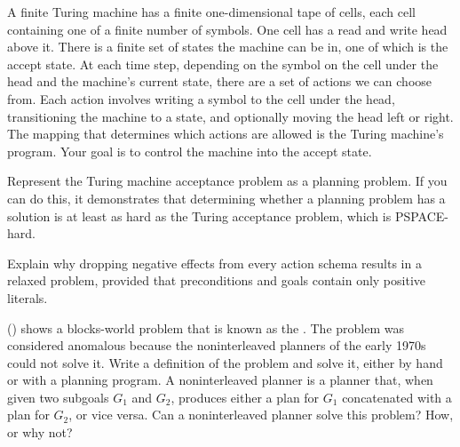 \begin{uexercise}
A finite Turing machine has a
finite one-dimensional tape of cells, each cell containing one of a
finite number of symbols.  One cell has a read and write head above
it. There is a finite set of states the machine can be in, one of
which is the accept state.  At each time step, depending on the symbol
on the cell under the head and the machine's current state, there are
a set of actions we can choose from. Each action involves writing a
symbol to the cell under the head, transitioning the machine to a
state, and optionally moving the head left or right. The mapping that
determines which actions are allowed is the Turing machine's program.
Your goal is to control the machine into the accept state.

Represent the Turing machine acceptance problem as a planning problem.
If you can do this, it demonstrates that determining whether a
planning problem has a solution is at least as hard as the Turing
acceptance problem, which is PSPACE-hard.
\end{uexercise} 



\begin{exercise}%
Explain why dropping negative effects from
every action schema results in a relaxed
problem, provided that preconditions and goals contain only positive literals.
\end{exercise} 

\begin{exercise}%
 () shows a blocks-world  problem
that is known as the . 
The problem was considered
anomalous because the noninterleaved planners
of the early 1970s could not solve it.  Write a definition of the
problem and solve it, either by hand or with a
planning program.  A noninterleaved planner is a planner that, when
given two subgoals \(G_{1}\) and \(G_{2}\), produces either a plan for \(G_{1}\) 
concatenated with a plan for \(G_{2}\), or vice versa.  Can a 
noninterleaved planner solve this 
problem? How, or why not?
\end{exercise} 

